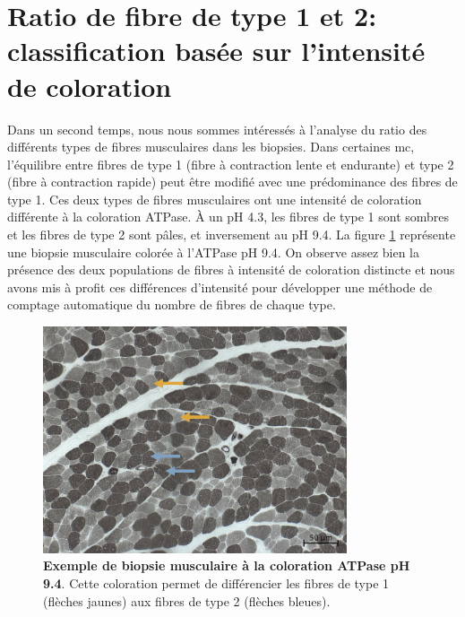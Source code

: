 \section{Ratio de fibre de type 1 et 2: classification basée sur l'intensité de coloration}

Dans un second temps, nous nous sommes intéressés à l'analyse du ratio des différents types de fibres musculaires dans les biopsies. Dans certaines \gls{mc}, l'équilibre entre fibres de type 1 (fibre à contraction lente et endurante) et type 2 (fibre à contraction rapide) peut être modifié avec une prédominance des fibres de type 1. Ces deux types de fibres musculaires ont une intensité de coloration différente à la coloration ATPase. À un pH 4.3, les fibres de type 1 sont sombres et les fibres de type 2 sont pâles, et inversement au pH 9.4. La figure \ref{fig:atp_example} représente une biopsie musculaire colorée à l'ATPase pH 9.4. On observe assez bien la présence des deux populations de fibres à intensité de coloration distincte et nous avons mis à profit ces différences d'intensité pour développer une méthode de comptage automatique du nombre de fibres de chaque type.
\begin{figure}[!ht]
 \centering
 \includegraphics[width=0.8\textwidth]{figures/atp_example.png}
 \caption[Exemple de biopsie musculaire à la coloration ATPase pH 9.4]{\textbf{Exemple de biopsie musculaire à la coloration ATPase pH 9.4}. Cette coloration permet de différencier les fibres de type 1 (flèches jaunes) aux fibres de type 2 (flèches bleues).}
 \label{fig:atp_example}
\end{figure}
